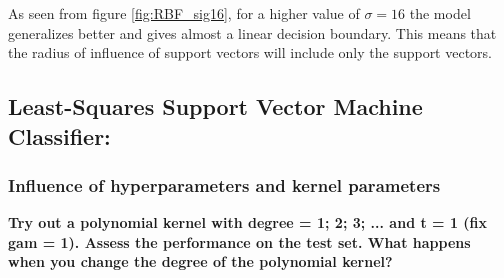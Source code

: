 \documentclass[12pt]{report}
\begin{document}
{As seen from figure \ref{fig:RBF_sig16}, for a higher value of $\sigma = 16$ the model generalizes better and gives almost a linear decision boundary. This means that the radius of influence of support vectors will include only the support vectors.

\subsection{Least-Squares Support Vector Machine Classifier:}
\subsubsection{Influence of hyperparameters and kernel parameters }
\textbf{Try out a polynomial kernel with degree = 1; 2; 3; ... and t = 1 (fix gam = 1). Assess	the performance on the test set. What happens when you change the degree of the polynomial kernel?}

}
\end{document}
